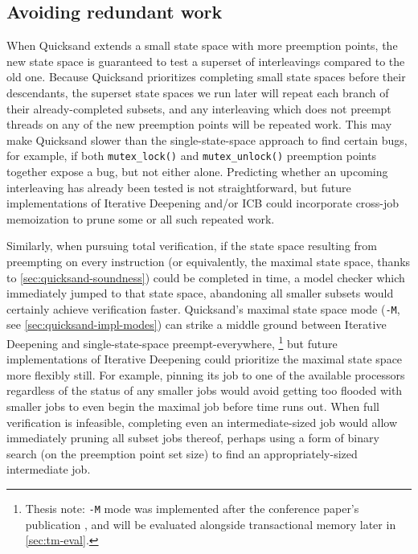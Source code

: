 \subsection{Avoiding redundant work}

When Quicksand extends a small state space with more preemption points,
the new state space is guaranteed to test a superset of interleavings compared to the old one.
Because Quicksand prioritizes completing small state spaces before their descendants,
the superset state spaces we run later will repeat each branch of their already-completed subsets,
and any interleaving which does not preempt threads on any of the new preemption points will be repeated work.
%
This may make Quicksand slower than the single-state-space approach to find certain bugs,
for example, if both {\tt mutex\_lock()} and {\tt mutex\_unlock()} preemption points
together expose a bug, but not either alone.
Predicting whether an upcoming interleaving has already been tested is not straightforward,
but future implementations
of Iterative Deepening and/or ICB
could incorporate cross-job memoization
to prune some or all such repeated work.

Similarly, when pursuing total verification,
if the state space resulting from preempting on every instruction
(or equivalently, the maximal state space, thanks to \cref{sec:quicksand-soundness})
could be completed in time,
a model checker which immediately jumped to that state space,
abandoning all smaller subsets would certainly achieve verification faster.
Quicksand's maximal state space mode ({\tt -M}, see \cref{sec:quicksand-impl-modes})
can strike a middle ground between Iterative Deepening and single-state-space preempt-everywhere,%
\footnote{Thesis note: {\tt -M} mode was implemented after the conference paper's publication \cite{quicksand},
and will be evaluated alongside transactional memory later in \cref{sec:tm-eval}.}
but future implementations of Iterative Deepening could prioritize the maximal state space more flexibly still.
For example, pinning its job to one of the available processors regardless of the status of any smaller jobs
would avoid getting too flooded with smaller jobs to even begin the maximal job before time runs out.
When full verification is infeasible,
completing even an intermediate-sized job would allow immediately pruning all subset jobs thereof,
perhaps using a form of binary search (on the preemption point set size) to find an appropriately-sized intermediate job.

